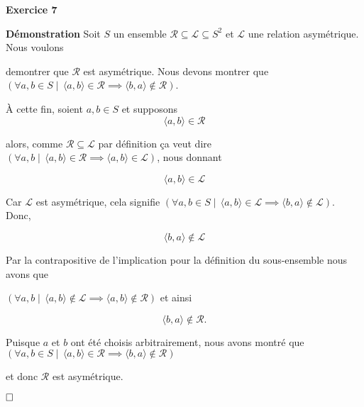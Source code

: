 \documentclass{article}
\begin{document}
\textbf{Exercice 7}

\vspace{0.5cm}

\textbf{Démonstration} Soit $S$ un ensemble $ \mathcal{R} \subseteq \mathcal{L} \subseteq S^2 $ et \( \mathcal{L} \) une relation asymétrique. Nous voulons 

demontrer que \( \mathcal{R} \) est asymétrique. Nous devons montrer que $\left(\forall  a, b \in S \mid \,  \langle a, b \rangle \in \mathcal{R} \implies \langle b,a \rangle \notin \mathcal{R} \right)$.

À cette fin, soient $a, b \in S$ et supposons
$$ \langle a, b \rangle \in \mathcal{R} $$

alors, comme $ \mathcal{R} \subseteq \mathcal{L} $ par définition ça veut dire $\left(\forall a, b \mid \,  \langle a, b \rangle \in \mathcal{R} \implies \langle a, b \rangle \in \mathcal{L} \right)$, nous donnant 

$$ \langle a, b \rangle \in \mathcal{L} $$

Car $\mathcal{L}$ est asymétrique, cela signifie $\left(\forall a, b \in S \mid \,  \langle a, b \rangle \in \mathcal{L} \implies \langle b,a  \rangle \notin \mathcal{L} \right)$. Donc,

$$\langle b, a \rangle \notin \mathcal{L}$$

Par la contrapositive de l'implication pour la définition du sous-ensemble nous avons que 

$\left(\forall  a, b \mid \,  \langle a, b \rangle \notin \mathcal{L} \implies \langle a, b \rangle \notin \mathcal{R} \right)$ et ainsi

$$\langle b,a \rangle \notin \mathcal{R}.$$

Puisque $a$ et $b$ ont été choisis arbitrairement, nous avons montré que $\left(\forall  a, b \in S \mid \,  \langle a, b \rangle \in \mathcal{R} \implies \langle b,a \rangle \notin \mathcal{R} \right)$ 

et donc \( \mathcal{R} \) est asymétrique.


$\hfill \square$
\end{document}
